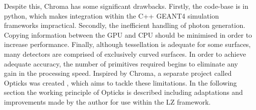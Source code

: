 \par
Despite this, Chroma has some significant drawbacks.
Firstly, the code-base is in python, which makes integration within the C++ GEANT4 simulation frameworks impractical.
Secondly, the inefficient handling of photon generation.
Copying information between the GPU and CPU should be minimised in order to increase performance.
Finally, although tessellation is adequate for some surfaces, many detectors are comprised of exclusively curved surfaces.
In order to achieve adequate accuracy, the number of primitives required begins to eliminate any gain in the processing speed.
Inspired by Chroma, a separate project called Opticks was created \cite{Opticks_Paper_2017_ref,Opticks_CHEP_2019_ref,Opticks_CHEP_2021_ref}, which aims to tackle these limitations.
In the following section the working principle of Opticks is described including adaptations and improvements made by the author for use within the LZ framework.


